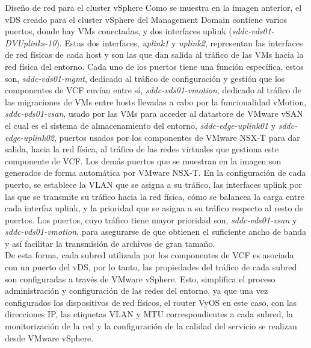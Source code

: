\begin{subsubsection}{Diseño de red para el cluster vSphere}
  Como se muestra en la imagen anterior, el vDS creado para el cluster vSphere del Management Domain contiene varios puertos, donde hay VMs conectadas, y dos interfaces uplink (\textit{sddc-vds01-DVUplinks-10}). Estas dos interfaces, \textit{uplink1} y \textit{uplink2}, representan las interfaces de red físicas de cada host y son las que dan salida al tráfico de las VMs hacia la red física del entorno. Cada uno de los puertos tiene una función específica, estos son, \textit{sddc-vds01-mgmt}, dedicado al tráfico de configuración y gestión que los componentes de VCF envían entre sí, \textit{sddc-vds01-vmotion}, dedicado al tráfico de las migraciones de VMs entre hosts llevadas a cabo por la funcionalidad vMotion, \textit{sddc-vds01-vsan}, usado por las VMs para acceder al datastore de VMware vSAN el cual es el sistema de almacenamiento del entorno, \textit{sddc-edge-uplink01} y \textit{sddc-edge-uplink02}, puertos usados por los componentes de VMware NSX-T para dar salida, hacia la red física, al tráfico de las redes virtuales que gestiona este componente de VCF. Los demás puertos que se muestran en la imagen son generados de forma automática por VMware NSX-T. 
  En la configuración de cada puerto, se establece la VLAN que se asigna a su tráfico, las interfaces uplink por las que se transmite su tráfico hacia la red física, cómo se balancea la carga entre cada interfaz uplink, y la prioridad que se asigna a su tráfico respecto al resto de puertos. Los puertos, cuyo tráfico tiene mayor prioridad son, \textit{sddc-vds01-vsan} y \textit{sddc-vds01-vmotion},  para asegurarse de que obtienen el suficiente ancho de banda y así facilitar la transmisión de archivos de gran tamaño. 
\\
  De esta forma, cada subred utilizada por los componentes de VCF es asociada con un puerto del vDS, por lo tanto, las propiedades del tráfico de cada subred son configuradas a través de VMware vSphere. Esto, simplifica el proceso administración y configuración de las redes del entorno, ya que una vez configurados los dispositivos de red físicos, el router VyOS en este caso, con las direcciones IP, las etiquetas VLAN y MTU correspondientes a cada subred, la monitorización de la red y la configuración de la calidad del servicio se realizan desde VMware vSphere.
  

\end{subsubsection}
